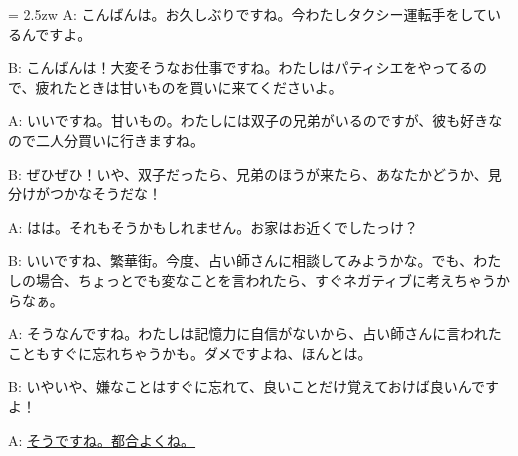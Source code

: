 \documentclass[11pt]{amsart}
\title{}
\author{}
\newenvironment{hangall}[1]{\hangindent = 2.5zw\everypar{\hangindent = 2.5zw}}{}
\begin{document}
\maketitle
\begin{hangall}{}%
A: こんばんは。お久しぶりですね。今わたしタクシー運転手をしているんですよ。

B: こんばんは！大変そうなお仕事ですね。わたしはパティシエをやってるので、疲れたときは甘いものを買いに来てくださいよ。

A: いいですね。甘いもの。わたしには双子の兄弟がいるのですが、彼も好きなので二人分買いに行きますね。

B: ぜひぜひ！いや、双子だったら、兄弟のほうが来たら、あなたかどうか、見分けがつかなそうだな！

A: はは。それもそうかもしれません。お家はお近くでしたっけ？

B: いいですね、繁華街。今度、占い師さんに相談してみようかな。でも、わたしの場合、ちょっとでも変なことを言われたら、すぐネガティブに考えちゃうからなぁ。

A: そうなんですね。わたしは記憶力に自信がないから、占い師さんに言われたこともすぐに忘れちゃうかも。ダメですよね、ほんとは。

B: いやいや、嫌なことはすぐに忘れて、良いことだけ覚えておけば良いんですよ！

A: \ul{そうですね。都合よくね。}\end{hangall}
\end{document}
